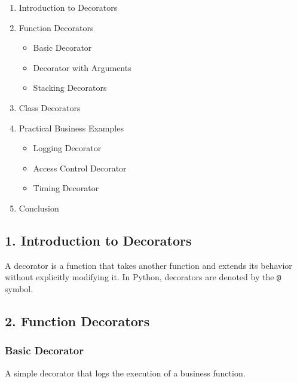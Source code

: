 \documentclass[
  letterpaper,
  DIV=11,
  numbers=noendperiod]{scrreprt}
\providecommand{\tightlist}{%
  \setlength{\itemsep}{0pt}\setlength{\parskip}{0pt}}\usepackage{longtable,booktabs,array}
\begin{document}
\begin{enumerate}
\def\labelenumi{\arabic{enumi}.}
\tightlist
\item
  Introduction to Decorators
\item
  Function Decorators

  \begin{itemize}
  \tightlist
  \item
    Basic Decorator
  \item
    Decorator with Arguments
  \item
    Stacking Decorators
  \end{itemize}
\item
  Class Decorators
\item
  Practical Business Examples

  \begin{itemize}
  \tightlist
  \item
    Logging Decorator
  \item
    Access Control Decorator
  \item
    Timing Decorator
  \end{itemize}
\item
  Conclusion
\end{enumerate}

\subsection{1. Introduction to
Decorators}\label{introduction-to-decorators}

A decorator is a function that takes another function and extends its
behavior without explicitly modifying it. In Python, decorators are
denoted by the \texttt{@} symbol.

\subsection{2. Function Decorators}\label{function-decorators}

\subsubsection{Basic Decorator}\label{basic-decorator}

A simple decorator that logs the execution of a business function.
\end{document}
